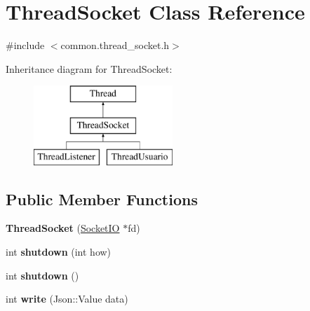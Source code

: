 \hypertarget{classThreadSocket}{\section{Thread\-Socket Class Reference}
\label{classThreadSocket}
}


{\ttfamily \#include $<$common.\-thread\-\_\-socket.\-h$>$}

Inheritance diagram for Thread\-Socket\-:\begin{figure}[H]
\begin{center}
\leavevmode
\includegraphics[height=3.000000cm]{classThreadSocket}
\end{center}
\end{figure}
\subsection*{Public Member Functions}
\begin{DoxyCompactItemize}
\item 
\hypertarget{classThreadSocket_acde9e8d6f617c737b3f1fcae8dbd5035}{{\bfseries Thread\-Socket} (\hyperlink{classSocketIO}{Socket\-I\-O} $\ast$fd)}\label{classThreadSocket_acde9e8d6f617c737b3f1fcae8dbd5035}

\item 
\hypertarget{classThreadSocket_adcd69d1774f9446524447212dc1aa4cf}{int {\bfseries shutdown} (int how)}\label{classThreadSocket_adcd69d1774f9446524447212dc1aa4cf}

\item 
\hypertarget{classThreadSocket_ad449f071be16b20b3a224602fc0cc1ac}{int {\bfseries shutdown} ()}\label{classThreadSocket_ad449f071be16b20b3a224602fc0cc1ac}

\item 
\hypertarget{classThreadSocket_a8c818be3e8fd7318494766e06346a58e}{int {\bfseries write} (Json\-::\-Value data)}\label{classThreadSocket_a8c818be3e8fd7318494766e06346a58e}

\end{DoxyCompactItemize}
